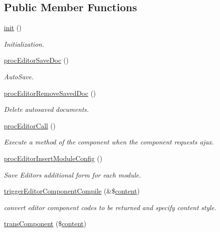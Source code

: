 \subsection*{Public Member Functions}
\begin{DoxyCompactItemize}
\item 
\hyperlink{classeditorController_a40838d463bafa5863b5f966b8828738b}{init} ()
\begin{DoxyCompactList}\small\item\em Initialization. \end{DoxyCompactList}\item 
\hyperlink{classeditorController_a671035df077f460bc8c60dcea0410344}{proc\+Editor\+Save\+Doc} ()
\begin{DoxyCompactList}\small\item\em Auto\+Save. \end{DoxyCompactList}\item 
\hyperlink{classeditorController_a869072fefa3ae722ecc0e0123b5f8bbd}{proc\+Editor\+Remove\+Saved\+Doc} ()
\begin{DoxyCompactList}\small\item\em Delete autosaved documents. \end{DoxyCompactList}\item 
\hyperlink{classeditorController_ab7eab43a1ba21645dabcf36f32b27289}{proc\+Editor\+Call} ()
\begin{DoxyCompactList}\small\item\em Execute a method of the component when the component requests ajax. \end{DoxyCompactList}\item 
\hyperlink{classeditorController_af20e397838bd94b60b09b0cba2d7da0d}{proc\+Editor\+Insert\+Module\+Config} ()
\begin{DoxyCompactList}\small\item\em Save Editor\textquotesingle{}s additional form for each module. \end{DoxyCompactList}\item 
\hyperlink{classeditorController_a6003487c398eae0676e15f5437cebdf8}{trigger\+Editor\+Component\+Compile} (\&\$\hyperlink{classcontent}{content})
\begin{DoxyCompactList}\small\item\em convert editor component codes to be returned and specify content style. \end{DoxyCompactList}\item 
\hyperlink{classeditorController_a9ef6499da56cf876c70813624ae4a2c0}{trans\+Component} (\$\hyperlink{classcontent}{content})

\end{DoxyCompactItemize}
